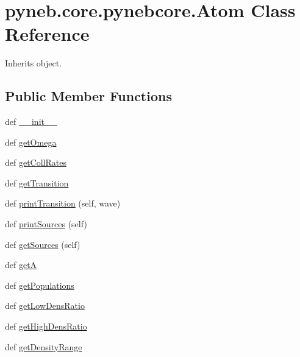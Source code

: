 \hypertarget{classpyneb_1_1core_1_1pynebcore_1_1_atom}{}\section{pyneb.\+core.\+pynebcore.\+Atom Class Reference}
\label{classpyneb_1_1core_1_1pynebcore_1_1_atom}


Inherits object.

\subsection*{Public Member Functions}
\begin{DoxyCompactItemize}
\item 
def \hyperlink{classpyneb_1_1core_1_1pynebcore_1_1_atom_ad92916e464a9e193eb3e49b84f253a35}{\+\_\+\+\_\+init\+\_\+\+\_\+}
\item 
def \hyperlink{classpyneb_1_1core_1_1pynebcore_1_1_atom_ae133eed382e284df01f2183da341534b}{get\+Omega}
\item 
def \hyperlink{classpyneb_1_1core_1_1pynebcore_1_1_atom_a34711ea989baf7bde752a68255d32098}{get\+Coll\+Rates}
\item 
def \hyperlink{classpyneb_1_1core_1_1pynebcore_1_1_atom_a7c9f17a3d9e841267add92377d9d1ede}{get\+Transition}
\item 
def \hyperlink{classpyneb_1_1core_1_1pynebcore_1_1_atom_a2e6b21ca9b8f63a8da2167bdaf0912f3}{print\+Transition} (self, wave)
\item 
def \hyperlink{classpyneb_1_1core_1_1pynebcore_1_1_atom_af603fa94afcc5893bc55a72cafc3fdd5}{print\+Sources} (self)
\item 
def \hyperlink{classpyneb_1_1core_1_1pynebcore_1_1_atom_a9d6390b03ff490938536167fe65d8a87}{get\+Sources} (self)
\item 
def \hyperlink{classpyneb_1_1core_1_1pynebcore_1_1_atom_a4b3ea50d7c77fdf645c2cea97243c17e}{get\+A}
\item 
def \hyperlink{classpyneb_1_1core_1_1pynebcore_1_1_atom_aab7496403c8aaef40ab3b20b5c00e9f0}{get\+Populations}
\item 
def \hyperlink{classpyneb_1_1core_1_1pynebcore_1_1_atom_aa6db2a3425e5a35f0bd04f05bcb25ee1}{get\+Low\+Dens\+Ratio}
\item 
def \hyperlink{classpyneb_1_1core_1_1pynebcore_1_1_atom_ac2e1509a2acc642c00696f3787e95f95}{get\+High\+Dens\+Ratio}
\item 
def \hyperlink{classpyneb_1_1core_1_1pynebcore_1_1_atom_a30ea60641df87c5eaf8af392d31da920}{get\+Density\+Range}

\end{DoxyCompactItemize}
